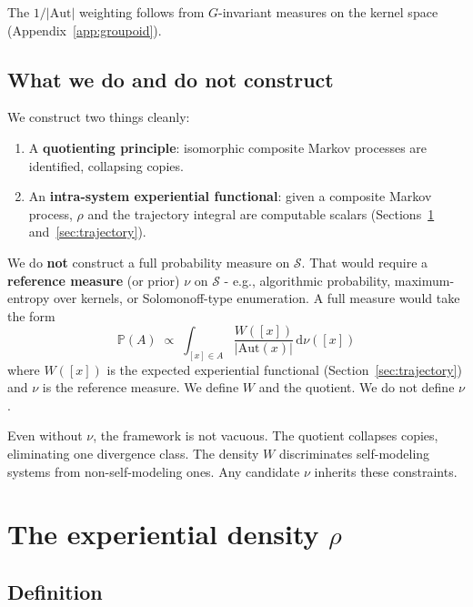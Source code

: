 \documentclass[12pt]{article}
\theoremstyle{remark}
\newcommand{\Aut}{\mathrm{Aut}}
\begin{document}
The $1/|\Aut|$ weighting follows from $G$-invariant measures on the kernel space (Appendix~\ref{app:groupoid}).

\subsection{What we do and do not construct}\label{sec:what-we-construct}

We construct two things cleanly:
\begin{enumerate}[leftmargin=2em]
\item A \textbf{quotienting principle}: isomorphic composite Markov processes are identified, collapsing copies.
\item An \textbf{intra-system experiential functional}: given a composite Markov process, $\rho$ and the trajectory integral are computable scalars (Sections~\ref{sec:density} and~\ref{sec:trajectory}).
\end{enumerate}

We do \textbf{not} construct a full probability measure on $\mathcal{S}$. That would require a \textbf{reference measure} (or prior) $\nu$ on $\mathcal{S}$ - e.g., algorithmic probability, maximum-entropy over kernels, or Solomonoff-type enumeration. A full measure would take the form
\begin{equation}\label{eq:full-measure}
  \mathbb{P}(A) \;\propto\; \int_{[x] \in A} \frac{W([x])}{|\Aut(x)|}\,\mathrm{d}\nu([x])
\end{equation}
where $W([x])$ is the expected experiential functional (Section~\ref{sec:trajectory}) and $\nu$ is the reference measure. We define $W$ and the quotient. We do not define $\nu$.

Even without $\nu$, the framework is not vacuous. The quotient collapses copies, eliminating one divergence class. The density $W$ discriminates self-modeling systems from non-self-modeling ones. Any candidate $\nu$ inherits these constraints.



\section{The experiential density $\rho$}\label{sec:density}

\subsection{Definition}\label{sec:rho-def}
\end{document}

